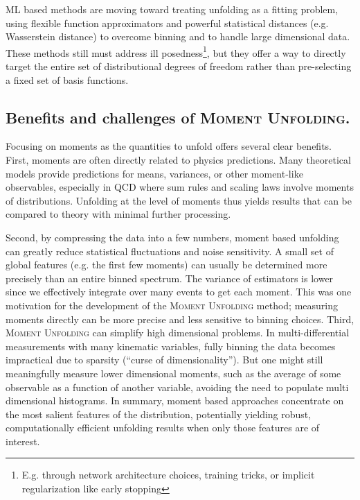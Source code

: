 {{            ML based methods are moving toward treating unfolding as a fitting problem, using flexible function approximators and powerful statistical distances (e.g. Wasserstein distance) to overcome binning and to handle large dimensional data.
            These methods still must address ill posedness\footnote{E.g. through network architecture choices, training tricks, or implicit regularization like early stopping}, but they offer a way to directly target the entire set of distributional degrees of freedom rather than pre-selecting a fixed set of basis functions.
    \subsection{Benefits and challenges of \textsc{Moment Unfolding}.}
        Focusing on moments as the quantities to unfold offers several clear benefits.
        First, moments are often directly related to physics predictions.
        Many theoretical models provide predictions for means, variances, or other moment-like observables, especially in QCD where sum rules and scaling laws involve moments of distributions.
        Unfolding at the level of moments thus yields results that can be compared to theory with minimal further processing.
        
        Second, by compressing the data into a few numbers, moment based unfolding can greatly reduce statistical fluctuations and noise sensitivity.
        A small set of global features (e.g. the first few moments) can usually be determined more precisely than an entire binned spectrum.
        The variance of estimators is lower since we effectively integrate over many events to get each moment.
        This was one motivation for the development of the \textsc{Moment Unfolding} method;
        measuring moments directly can be more precise and less sensitive to binning choices.
        Third, \textsc{Moment Unfolding} can simplify high dimensional problems.
        In multi-differential measurements with many kinematic variables, fully binning the data becomes impractical due to sparsity (``curse of dimensionality'').
        But one might still meaningfully measure lower dimensional moments, such as the average of some observable as a function of another variable, avoiding the need to populate multi dimensional histograms.
        In summary, moment based approaches concentrate on the most salient features of the distribution, potentially yielding robust, computationally efficient unfolding results when only those features are of interest.

}}
